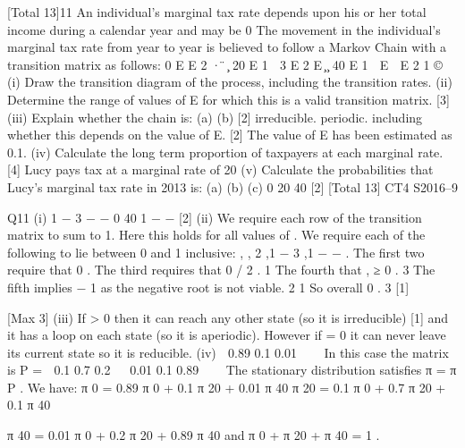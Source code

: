 [Total 13]11
An individual’s marginal tax rate depends upon his or her total income during a
calendar year and may be 0%
The movement in the individual’s marginal tax rate from year to year is believed to
follow a Markov Chain with a transition matrix as follows:
0%
E
E 2 ·
 ̈
 ̧
20%
E
1  3 E
2 E  ̧
 ̧
40%
E
1  E  E 2 1
©
(i) Draw the transition diagram of the process, including the transition rates.
(ii) Determine the range of values of E for which this is a valid transition matrix.
[3]
(iii) Explain whether the chain is:
(a)
(b)
[2]
irreducible.
periodic.
including whether this depends on the value of E.
[2]
The value of E has been estimated as 0.1.
(iv)
Calculate the long term proportion of taxpayers at each marginal rate.
[4]
Lucy pays tax at a marginal rate of 20%
(v)
Calculate the probabilities that Lucy’s marginal tax rate in 2013 is:
(a)
(b)
(c)
0%
20%
40%
[2]
[Total 13]
CT4 S2016–9




Q11
(i)
1 − 3%
\beta
{}\beta
{} − \beta −
0%
40%
1 − \beta − 
[2]
(ii)
We require each row of the transition matrix to sum to 1. 
Here this holds for all values of \beta . 
We require each of the following to lie between 0 and 1 inclusive:
\beta ,  , 2 \beta ,1 − 3 \beta ,1 − \beta −  .
The first two require that 0 \leq \beta {} . 
The third requires that 0 \leq \beta {}/ 2 . 
1
The fourth that \beta \leq , \beta ≥ 0 .
3 
The fifth implies \beta {} − 1
as the negative root is not viable.
2
1
So overall 0 \leq \beta \leq .
3
[1]

[Max 3]
(iii)
If \beta > 0 then it can reach any other state (so it is irreducible) [1]
and it has a loop on each state (so it is aperiodic). 
However if \beta = 0 it can never leave its current state so it is reducible. 
(iv)
 0.89 0.1 0.01 


In this case the matrix is P =  0.1 0.7 0.2 
 0.01 0.1 0.89 

 
The stationary distribution satisfies π = π P . 
We have:
π 0 = 0.89 π 0 + 0.1 π 20 + 0.01 π 40
π 20 = 0.1 π 0 + 0.7 π 20 + 0.1 π 40

π 40 = 0.01 π 0 + 0.2 π 20 + 0.89 π 40
and
π 0 + π 20 + π 40 = 1 .

